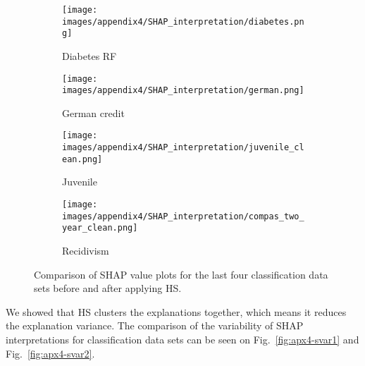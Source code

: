 \begin{figure}[hbt]
    \centering
    \begin{subfigure}[b]{0.80\textwidth}
        \centering
        \texttt{[image: images/appendix4/SHAP\_interpretation/diabetes.png]}
        \caption{Diabetes RF}
    \end{subfigure}
    
    \begin{subfigure}[b]{0.80\textwidth}
        \centering
        \texttt{[image: images/appendix4/SHAP\_interpretation/german.png]}
        \caption{German credit}
    \end{subfigure}
    
    \begin{subfigure}[b]{0.80\textwidth}
        \centering
        \texttt{[image: images/appendix4/SHAP\_interpretation/juvenile\_clean.png]}
        \caption{Juvenile}
    \end{subfigure}
    
    \begin{subfigure}[b]{0.80\textwidth}
        \centering
        \texttt{[image: images/appendix4/SHAP\_interpretation/compas\_two\_year\_clean.png]}
        \caption{Recidivism}
    \end{subfigure}
    \caption{Comparison of SHAP value plots for the last four classification data sets before and after applying HS.}
    \label{fig:apx4-sval2}
\end{figure}

We showed that HS clusters the explanations together, which means it reduces the explanation variance. The comparison of the variability of SHAP interpretations for classification data sets can be seen on Fig.~\ref{fig:apx4-svar1} and Fig.~\ref{fig:apx4-svar2}.


